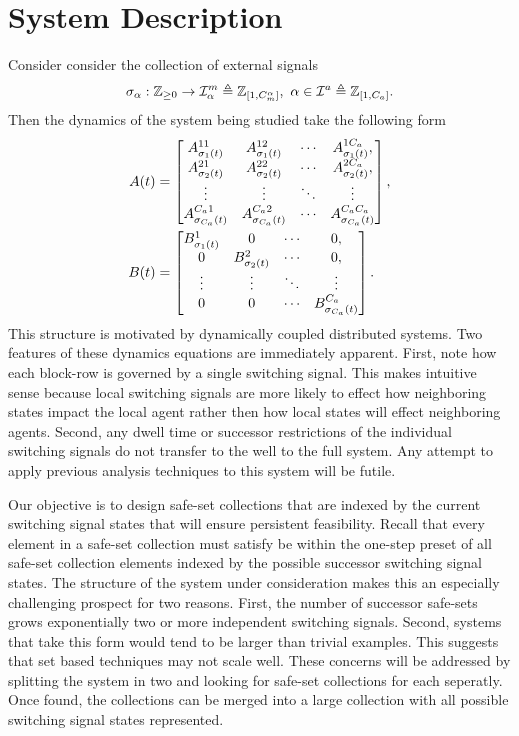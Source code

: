 \section{System Description}
Consider consider the collection of external signals  
$$\ss_\agentidx:\int\rgeq{0}\rightarrow\modeidxset[\agentidx]\triangleq\int\rii{1}{\nummodes[\agentidx]},\ \agentidx\in\agentidxset\triangleq\int\rii{1}{\numagents}.$$ 
Then the dynamics of the system being studied take the following form
\begin{align}
A(t)&=\begin{bmatrix}
A^{11}_{{\sigma}_1(t)}&A^{12}_{{\sigma}_1(t)}&\cdots&A^{1{C_a}}_{{\sigma}_1(t)},\\
A^{21}_{{\sigma}_2(t)}&A^{22}_{{\sigma}_2(t)}&\cdots&A^{2{C_a}}_{{\sigma}_2(t)},\\
\vdots&\vdots & \ddots & \vdots\\
A^{{C_a} 1}_{{\sigma}_{{C_a}}(t)} & A^{{C_a} 2}_{{\sigma}_{{C_a}}(t)} &\cdots & A^{{C_a} {C_a}}_{{\sigma}_{{C_a}}(t)} 
\end{bmatrix},\\
B(t)&=\begin{bmatrix}
B^{1}_{{\sigma}_1(t)}&0&\cdots&0,\\
0&B^{2}_{{\sigma}_2(t)}&\cdots&0,\\
\vdots&\vdots & \ddots & \vdots\\
0 & 0 &\cdots & B^{{C_a}}_{{\sigma}_{{C_a}}(t)} 
\end{bmatrix}.
\end{align}
This structure is motivated by dynamically coupled distributed systems. Two features of these dynamics equations are immediately apparent. First, note how each block-row is governed by a single switching signal. This makes intuitive sense because local switching signals are more likely to effect how neighboring states impact the local agent rather then how local states will effect neighboring agents. Second, any dwell time or successor restrictions of the individual switching signals do not transfer to the well to the full system. Any attempt to apply previous analysis techniques to this system will be futile. 

Our objective is to design safe-set collections that are indexed by the current switching signal states that will ensure persistent feasibility. Recall that every element in a safe-set collection must satisfy be within the one-step preset of all safe-set collection elements indexed by the possible successor switching signal states. The structure of the system under consideration makes this an especially challenging prospect for two reasons. First, the number of successor safe-sets grows exponentially two or more independent switching signals. Second, systems that take this form would tend to be larger than trivial examples. This suggests that set based techniques may not scale well. These concerns will be addressed by splitting the system in two and looking for safe-set collections for each seperatly. Once found, the collections can be merged into a large collection with all possible switching signal states represented.

